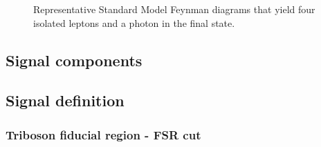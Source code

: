 \begin{figure}
  \centering
\caption{Representative Standard Model Feynman diagrams that yield four isolated leptons and a photon in the final state.}
\label{fig:ppTo4LG}
\end{figure}

\subsection{Signal components}


\subsection{Signal definition}


\subsubsection{Triboson fiducial region - FSR cut}

